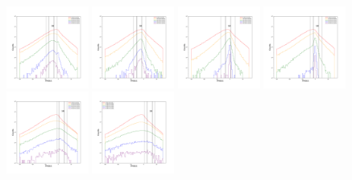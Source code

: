 \documentclass[12pt,prd]{article}
\begin{document}
\begin{figure}[h!]
\includegraphics[width=0.24\textwidth]{../figures/scanning_plotsgaiascan_l78_8_b58_4_ra224_7_dec46_3_npy_10.pdf}
\includegraphics[width=0.24\textwidth]{../figures/scanning_plotsgaiascan_l78_8_b58_4_ra224_7_dec46_3_npy_11.pdf}
\includegraphics[width=0.24\textwidth]{../figures/scanning_plotsgaiascan_l78_8_b58_4_ra224_7_dec46_3_npy_12.pdf}
\includegraphics[width=0.24\textwidth]{../figures/scanning_plotsgaiascan_l78_8_b58_4_ra224_7_dec46_3_npy_13.pdf}
\includegraphics[width=0.24\textwidth]{../figures/scanning_plotsgaiascan_l78_8_b58_4_ra224_7_dec46_3_npy_14.pdf}
\includegraphics[width=0.24\textwidth]{../figures/scanning_plotsgaiascan_l78_8_b58_4_ra224_7_dec46_3_npy_15.pdf}

\end{figure}
\end{document}
